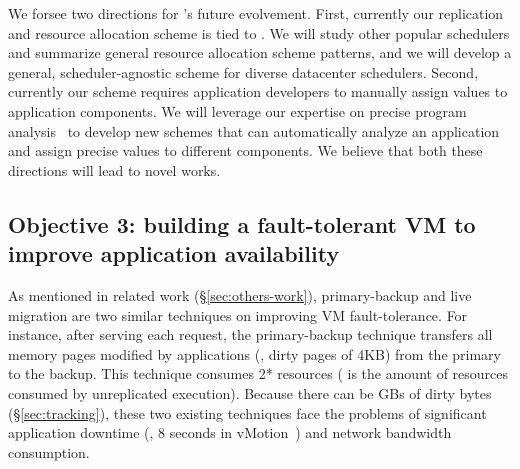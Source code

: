 
 We forsee two directions for \tripod's 
future evolvement. First, currently our replication and resource allocation 
scheme is tied to \mesos. We will study other popular schedulers and summarize 
general resource allocation scheme patterns, and we will develop a general, 
scheduler-agnostic scheme for diverse datacenter schedulers. Second, currently  
our scheme requires application developers to manually assign  values to 
application components. We will leverage our expertise on precise program 
analysis~\cite{peregrine:sosp11,woodpecker:asplos13} to develop new schemes 
that can automatically analyze an application and assign precise  values 
to different components. We believe that both these directions will lead to 
novel works.

\vspace{-.15in}\subsection{Objective 3: building a fault-tolerant VM to improve 
application availability}\label{sec:vm}\vspace{-.075in}



As mentioned in related work (\S\ref{sec:others-work}), primary-backup and live 
migration are two similar techniques on improving VM fault-tolerance. For 
instance, after serving each request, the primary-backup technique transfers all 
memory pages modified by applications (\ie, dirty pages of 4KB) from the 
primary to the backup. This technique consumes 2* resources ( is 
the amount of resources consumed by unreplicated execution). Because there can 
be GBs of dirty bytes (\S\ref{sec:tracking}), these two existing techniques 
face the problems of significant application downtime (\eg, 8 seconds in 
vMotion~\cite{vmotion:atc05}) and network bandwidth consumption.

